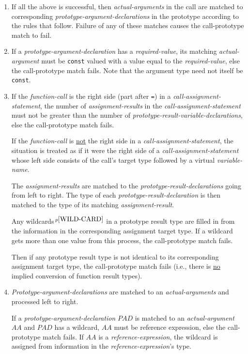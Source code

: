 \documentclass[12pt]{article}
\newcommand{\pagnote}[1]{$\,^{p\pageref{#1}}$}
\begin{document}
\begin{enumerate}
\item If all the above is successful, then {\em actual-arguments}
in the call are matched to corresponding {\em prototype-argument-declarations}
in the prototype according to the rules that follow.
Failure of any of these matches causes
the call-prototype match to fail.

\item\label{CALL-PROTOTYPE-REQUIRED-VALUES}
If a {\em prototype-argument-declaration} has a {\em required-value},
its matching {\em actual-argument} must be {\tt const} valued with
a value equal to the {\em required-value}, else the call-prototype
match fails.  Note that the argument type need not itself be {\tt const}.

\item\label{CALL-PROTOTYPE-RESULT-MATCHING}
If the {\em function-call} is the right side (part after {\tt =})
in a {\em call-assignment-statement},
the number of {\em assignment-results} in the {\em call-assignment-statement}
must not be greater than the number of
{\em prototype-result-variable-declarations}, else the call-prototype
match fails.

If the {\em function-call} is \underline{not} the right side in a
{\em call-assignment-statement}, the situation is treated as if
it were the right side of a {\em call-assignment-statement}
whose left side consists of the call's target type
followed by a virtual {\em variable-name}.

The {\em assignment-results} are matched to the
{\em prototype-result-declarations} going from left to right.
The type of each {\em prototype-result-declaration} is then
matched to the type of its matching {\em assignment-result}.

Any wildcards\pagnote{WILD-CARD}
in a prototype result type are filled in from the information
in the corresponding assignment target type.  If a wildcard gets more
than one value from this process, the call-prototype match fails.

Then if any prototype result type is not identical to its corresponding
assignment target type, the call-prototype match fails
(i.e., there is \underline{no} implied conversion of function result
types).

\item\label{CALL-PROTOTYPE-ARGUMENT-MATCHING}
{\em Prototype-argument-declarations} are matched to
an {\em actual-arguments} and processed left to right.

If a {\em prototype-argument-declaration} $PAD$ is matched
to an {\em actual-argument} $AA$ and $PAD$ has a wildcard,
$AA$ must be reference expression, else the
call-prototype match fails.  If $AA$ is a {\em reference-expression}, the
wildcard is assigned from information in the {\em reference-expression}'s type.


\end{enumerate}
\end{document}
